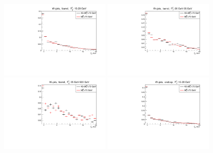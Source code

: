 \begin{figure}[htb]
  \begin{center}
  \includegraphics[width=0.48\textwidth]{../figs/figs_v11/MUON_WGamma/QuickChecks/cTemplatesVsWMt_Wjets_phoPFChIsoCorr_BARREL_pt15to20.pdf} \includegraphics[width=0.48\textwidth]{../figs/figs_v11/MUON_WGamma/QuickChecks/cTemplatesVsWMt_Wjets_phoPFChIsoCorr_BARREL_pt20to35.pdf} \\
  \includegraphics[width=0.48\textwidth]{../figs/figs_v11/MUON_WGamma/QuickChecks/cTemplatesVsWMt_Wjets_phoPFChIsoCorr_BARREL_pt35to500.pdf}  \includegraphics[width=0.48\textwidth]{../figs/figs_v11/MUON_WGamma/QuickChecks/cTemplatesVsWMt_Wjets_phoPFChIsoCorr_ENDCAP_pt15to20.pdf} \\

\end{center}
\end{figure}
